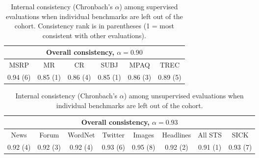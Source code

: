 \begin{table*}[h]
\renewcommand{\tabcolsep}{4.6pt}
\small
\begin{center}
      {
        \begin{tabular}{cccccc}
          \multicolumn{6}{c}{Overall consistency, \(\alpha = 0.90\)}\\
          \hline
                     MSRP & MR & CR & SUBJ & MPAQ & TREC  \\
                                          \footnotesize  0.94 (6) &	0.85 (1)	 &0.86 (4)	 &0.85 (1) &	0.86	(3) &0.89 (5) \\
                                          \hline
        \end{tabular}
    }
    \caption{\label{consistency} Internal consistency (Chronbach's \(\alpha\)) among supervised evaluations when individual benchmarks are left out of the cohort. Consistency rank is in parentheses (1 = most consistent with other evaluations).}
  \end{center}
\end{table*}

\vspace{-7mm}
\begin{table*}[h]
\renewcommand{\tabcolsep}{4.6pt}
\small
\begin{center}
      {
        \begin{tabular}{cccccccc}
           \multicolumn{8}{c}{Overall consistency, \(\alpha = 0.93\)} \\
          \hline
                     News & Forum & WordNet & Twitter & Images & Headlines & All STS  & SICK \\
                                          \footnotesize 0.92	(4) &0.92 (3)	 &0.92 (4) &	0.93 (6)  &	0.95 (8)	 &0.92 (2)  &	0.91 (1)  &0.93 (7) \\
                                          \hline
        \end{tabular}
    }
    \caption{Internal consistency (Chronbach's \(\alpha\)) among unsupervised evaluations when individual benchmarks are left out of the cohort.}
  \end{center}
\end{table*}







